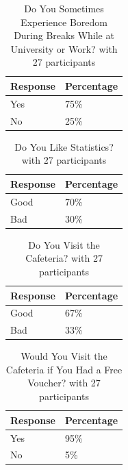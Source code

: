 \documentclass{article}
\begin{document}
\begin{longtable}[]{@{}ll@{}}
\caption{Do You Sometimes Experience Boredom During Breaks While at University or Work? with 27 participants} \label{do-you-sometimes-experience-boredom-during-breaks-while-at-university-or-work} \\
\toprule\noalign{}
Response & Percentage \\
\midrule\noalign{}
\endhead
\bottomrule\noalign{}
\endlastfoot
Yes & 75\% \\
No & 25\% \\
\end{longtable}

\begin{longtable}[]{@{}ll@{}}
\caption{Do You Like Statistics? with 27 participants} \label{do-you-like-statistics} \\
\toprule\noalign{}
Response & Percentage \\
\midrule\noalign{}
\endhead
\bottomrule\noalign{}
\endlastfoot
Good & 70\% \\
Bad & 30\% \\
\end{longtable}

\begin{longtable}[]{@{}ll@{}}
\caption{Do You Visit the Cafeteria? with 27 participants} \label{do-you-visit-the-cafeteria} \\
\toprule\noalign{}
Response & Percentage \\
\midrule\noalign{}
\endhead
\bottomrule\noalign{}
\endlastfoot
Good & 67\% \\
Bad & 33\% \\
\end{longtable}

\begin{longtable}[]{@{}ll@{}}
\caption{Would You Visit the Cafeteria if You Had a Free Voucher? with 27 participants} \label{would-you-visit-the-cafeteria-if-you-had-a-free-voucher} \\
\toprule\noalign{}
Response & Percentage \\
\midrule\noalign{}
\endhead
\bottomrule\noalign{}
\endlastfoot
Yes & 95\% \\
No & 5\% \\
\end{longtable}
\end{document}
